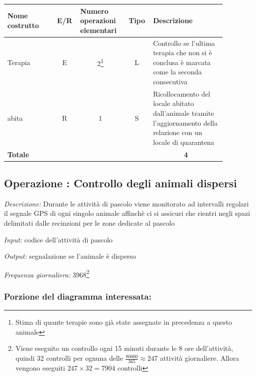 \documentclass[12pt,a4paper]{article}
\begin{document}
\begin{center}\setlength{\extrarowheight}{1.5pt}\begin{longtable}{|p{0.2\linewidth}|p{0.1\linewidth}|p{0.175\linewidth}|p{0.1\linewidth}|p{0.3\linewidth}|}\hline \textbf{Nome costrutto}   & \multicolumn{1}{|c|}{\textbf{E/R}} & \textbf{Numero operazioni elementari} & \multicolumn{1}{|c|}{\textbf{Tipo}} & \textbf{Descrizione}\\ 
\hline
Terapia
 & 
\multicolumn{1}{|c|}{E}
 & 
\multicolumn{1}{|c|}{2\footnote{Stima di quante terapie sono già state assegnate in precedenza a questo animale}}
 & 
\multicolumn{1}{|c|}{L}
 & 
Controllo se l'ultima terapia che non si è conclusa è marcata come la seconda consecutiva
\\
\hline
abita
 & 
\multicolumn{1}{|c|}{R}
 & 
\multicolumn{1}{|c|}{1}
 & 
\multicolumn{1}{|c|}{S}
 & 
Ricollocamento del locale abitato dall'animale tramite l'aggiornamento della relazione con un locale di quarantena
\\
\hline
\multicolumn{4}{|l|}{\textbf{Totale}}
 & 
\multicolumn{1}{|c|}{\textbf{4}}
\\
\hline
\end{longtable}\end{center}
\pagebreak
\subsection*{Operazione \thecounterAccessi{}: Controllo degli animali dispersi}
\noindent\textit{Descrizione:} Durante le attività di pascolo viene monitorato ad intervalli regolari il segnale GPS di ogni singolo animale affinchè ci si assicuri che rientri negli spazi delimitati dalle recinzioni per le zone dedicate al pascolo

\noindent\textit{Input:} codice dell'attività di pascolo

\noindent\textit{Output:} segnalazione se l'animale è disperso

\noindent\textit{Frequenza giornaliera:} 3968\footnote{Viene eseguito un controllo ogni 15 minuti durante le 8 ore dell'attività, quindi 32 controlli per ognuna delle $\frac{90000}{365}\approx 247$ attività giornaliere. Allora vengono eseguiti $247\times 32 = 7904$ controlli}

\subsubsection*{Porzione del diagramma interessata:}
\end{document}

